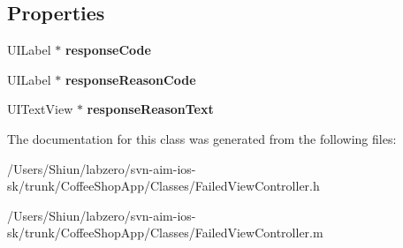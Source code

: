 \subsection*{Properties}
\begin{DoxyCompactItemize}
\item 
\hypertarget{interface_failed_view_controller_ad8a6e25dd16847d6f82d314437784acb}{
UILabel $\ast$ {\bfseries responseCode}}
\label{interface_failed_view_controller_ad8a6e25dd16847d6f82d314437784acb}

\item 
\hypertarget{interface_failed_view_controller_a51a204e75e12dbdc47300570f62899ae}{
UILabel $\ast$ {\bfseries responseReasonCode}}
\label{interface_failed_view_controller_a51a204e75e12dbdc47300570f62899ae}

\item 
\hypertarget{interface_failed_view_controller_a5f651d8f5483ea1b5f241019cf8fc487}{
UITextView $\ast$ {\bfseries responseReasonText}}
\label{interface_failed_view_controller_a5f651d8f5483ea1b5f241019cf8fc487}

\end{DoxyCompactItemize}


The documentation for this class was generated from the following files:\begin{DoxyCompactItemize}
\item 
/Users/Shiun/labzero/svn-\/aim-\/ios-\/sk/trunk/CoffeeShopApp/Classes/FailedViewController.h\item 
/Users/Shiun/labzero/svn-\/aim-\/ios-\/sk/trunk/CoffeeShopApp/Classes/FailedViewController.m\end{DoxyCompactItemize}
